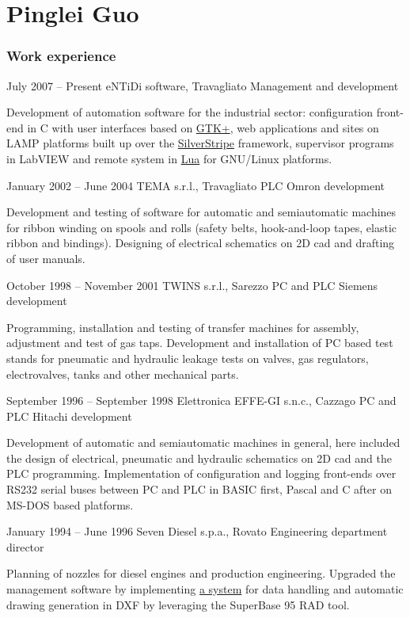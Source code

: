 \documentclass[fontsize=10pt]{tccv}
\begin{document}
\part{Pinglei Guo}

\section{Work experience}

\begin{eventlist}

\item{July 2007 -- Present}
     {eNTiDi software, Travagliato}
     {Management and development}

Development of automation software for the industrial sector:
configuration front-end in C with user interfaces based on
\href{http://www.gtk.org/}{GTK+}, web applications and sites
on LAMP platforms built up over the
\href{http://www.silverstripe.org/}{SilverStripe} framework,
supervisor programs in LabVIEW and remote system in
\href{http://www.lua.org/}{Lua} for GNU/Linux platforms.

\item{January 2002 -- June 2004}
     {TEMA s.r.l., Travagliato}
     {PLC Omron development}

Development and testing of software for automatic and semiautomatic
machines for ribbon winding on spools and rolls (safety belts,
hook-and-loop tapes, elastic ribbon and bindings). Designing of
electrical schematics on 2D cad and drafting of user manuals.

\item{October 1998 -- November 2001}
     {TWINS s.r.l., Sarezzo}
     {PC and PLC Siemens development}

Programming, installation and testing of transfer machines for assembly,
adjustment and test of gas taps. Development and installation of PC
based test stands for pneumatic and hydraulic leakage tests on valves,
gas regulators, electrovalves, tanks and other mechanical parts.

\item{September 1996 -- September 1998}
     {Elettronica EFFE-GI s.n.c., Cazzago}
     {PC and PLC Hitachi development}

Development of automatic and semiautomatic machines in general, here
included the design of electrical, pneumatic and hydraulic schematics on
2D cad and the PLC programming. Implementation of configuration and
logging front-ends over RS232 serial buses between PC and PLC in BASIC
first, Pascal and C after on MS-DOS based platforms.

\item{January 1994 -- June 1996}
     {Seven Diesel s.p.a., Rovato}
     {Engineering department director}

Planning of nozzles for diesel engines and production engineering.
Upgraded the management software by implementing
\href{http://adg.entidi.com/home/history/}{a system} for data handling
and automatic drawing generation in DXF by leveraging the SuperBase 95
RAD tool.

\end{eventlist}
\end{document}
